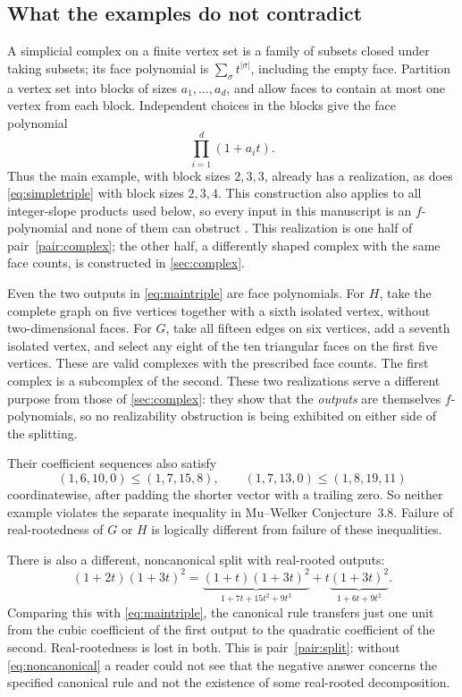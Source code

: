 \documentclass[11pt,letterpaper]{article}
\numberwithin{equation}{section}
\theoremstyle{definition}
\theoremstyle{remark}
\begin{document}
\subsection{What the examples do not contradict}\label{subsec:complexes}

A simplicial complex on a finite vertex set is a family of subsets closed
under taking subsets; its face polynomial is
$\sum_{\sigma}t^{|\sigma|}$, including the empty face. Partition a vertex
set into blocks of sizes $a_1,\ldots,a_d$, and allow faces to contain at most
one vertex from each block. Independent choices in the blocks give the
face polynomial
\begin{equation}\label{eq:join}
 \prod_{i=1}^d(1+a_it).
\end{equation}
Thus the main example, with block sizes $2,3,3$, already has a realization,
as does \eqref{eq:simpletriple} with block sizes $2,3,4$. This construction
also applies to all integer-slope products used below, so every input in this
manuscript is an $f$-polynomial and none of them can obstruct
\cite[Question~1.1]{MW}. This realization is one half of
pair~\ref{pair:complex}; the other half, a differently shaped complex with the
same face counts, is constructed in \cref{sec:complex}.

Even the two outputs in \eqref{eq:maintriple} are face polynomials. For $H$,
take the complete graph on five vertices together with a sixth isolated
vertex, without two-dimensional faces. For $G$, take all fifteen edges on
six vertices, add a seventh isolated vertex, and select any eight of the
ten triangular faces on the first five vertices. These are valid complexes
with the prescribed face counts. The first complex is a subcomplex of the
second. These two realizations serve a different purpose from those of
\cref{sec:complex}: they show that the \emph{outputs} are themselves
$f$-polynomials, so no realizability obstruction is being exhibited on either
side of the splitting.

Their coefficient sequences also satisfy
\[
 (1,6,10,0)\le(1,7,15,8),\qquad
 (1,7,13,0)\le(1,8,19,11)
\]
coordinatewise, after padding the shorter vector with a trailing zero. So
neither example violates the separate inequality in Mu--Welker
Conjecture~3.8. Failure of real-rootedness of $G$ or $H$ is logically
different from failure of these inequalities.

There is also a different, noncanonical split with real-rooted outputs:
\begin{equation}\label{eq:noncanonical}
 (1+2t)(1+3t)^2
 =\underbrace{(1+t)(1+3t)^2}_{1+7t+15t^2+9t^3}
 +t\underbrace{(1+3t)^2}_{1+6t+9t^2}.
\end{equation}
Comparing this with \eqref{eq:maintriple}, the canonical rule transfers just
one unit from the cubic coefficient of the first output to the quadratic
coefficient of the second. Real-rootedness is lost in both. This is
pair~\ref{pair:split}: without \eqref{eq:noncanonical} a reader could not see
that the negative answer concerns the specified canonical rule and not the
existence of some real-rooted decomposition.
\end{document}
